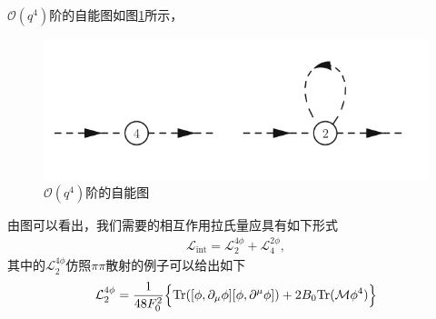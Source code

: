 \documentclass[aps,tightenlines,16pt]{ctexart}
\numberwithin{equation}{section}
\newcommand{\mL}{\mathcal{L}}
\newcommand{\Tr}{\text{Tr}}
\begin{document}
$\mathcal{O}(q^4)$阶的自能图如图\ref{zineng}所示，
\begin{figure}
   \centering
   \includegraphics[scale=0.7]{4zineng.png}\caption{$\mathcal{O}(q^4)$阶的自能图}\label{zineng}
\end{figure}
由图可以看出，我们需要的相互作用拉氏量应具有如下形式
\begin{align}
   \mL_{\text{int}}=\mL_2^{4\phi}+\mL_4^{2\phi},
\end{align}
其中的$\mL_2^{4\phi}$仿照$\pi\pi$散射的例子可以给出如下
\begin{align}
   \mL_2^{4\phi}=\frac{1}{48F_0^2}\Bigl\{\Tr([\phi,\partial_{\mu}\phi][\phi,\partial^{\mu}\phi])+2B_0\Tr(\mathcal{M}\phi^4)\Bigr\}
\end{align}
\end{document}
